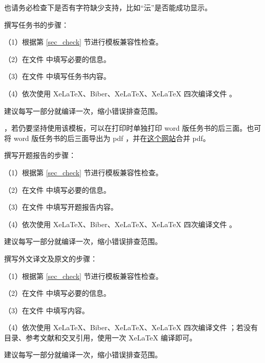 也请务必检查下是否有字符缺少支持，比如“沄”是否能成功显示。


撰写任务书的步骤：

  （1）根据第 \ref{sec_check} 节进行模板兼容性检查。

  （2）在文件  中填写必要的信息。

  （3）在文件  中填写任务书内容。

  （4）依次使用 XeLaTeX、Biber、XeLaTeX、XeLaTeX 四次编译文件 。

建议每写一部分就编译一次，缩小错误排查范围。

，若仍要坚持使用该模板，可以在打印时单独打印 word 版任务书的后三面。也可将  word 版任务书的后三面导出为 pdf ，并在\href{https://www.ilovepdf.com/zh-cn/merge_pdf}{这个网站}合并 pdf。


撰写开题报告的步骤：

（1）根据第 \ref{sec_check} 节进行模板兼容性检查。

（2）在文件  中填写必要的信息。

（3）在文件  中填写开题报告内容。

（4）依次使用 XeLaTeX、Biber、XeLaTeX、XeLaTeX 四次编译文件 。

建议每写一部分就编译一次，缩小错误排查范围。


撰写外文译文及原文的步骤：

（1）根据第 \ref{sec_check} 节进行模板兼容性检查。

（2）在文件  中填写必要的信息。

（3）在文件  中填写内容。

（4）依次使用 XeLaTeX、Biber、XeLaTeX、XeLaTeX 四次编译文件 ；若没有目录、参考文献和交叉引用，使用一次 XeLaTeX 编译即可。

建议每写一部分就编译一次，缩小错误排查范围。



